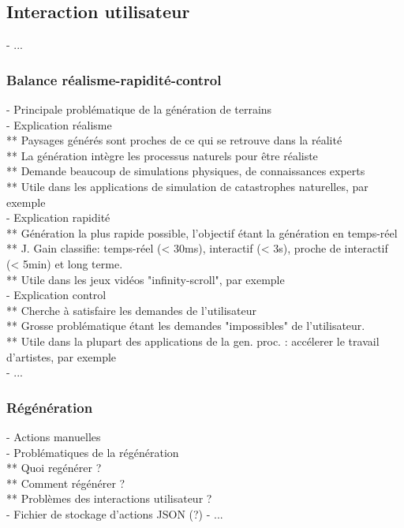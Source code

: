 \subsection{Interaction utilisateur}
- ...

\subsubsection{Balance réalisme-rapidité-control}
- Principale problématique de la génération de terrains \\
- Explication réalisme \\
** Paysages générés sont proches de ce qui se retrouve dans la réalité \\
** La génération intègre les processus naturels pour être réaliste \\
** Demande beaucoup de simulations physiques, de connaissances experts \\
** Utile dans les applications de simulation de catastrophes naturelles, par exemple \\
- Explication rapidité \\
** Génération la plus rapide possible, l'objectif étant la génération en temps-réel \\
** J. Gain classifie: temps-réel (< 30ms), interactif (< 3s), proche de interactif (< 5min) et long terme. \\
** Utile dans les jeux vidéos "infinity-scroll", par exemple\\
- Explication control \\
** Cherche à satisfaire les demandes de l'utilisateur \\
** Grosse problématique étant les demandes "impossibles" de l'utilisateur. \\
** Utile dans la plupart des applications de la gen. proc. : accélerer le travail d'artistes, par exemple \\
- ...

\subsubsection{Régénération}
- Actions manuelles \\
- Problématiques de la régénération \\
** Quoi regénérer ? \\
** Comment régénérer ? \\
** Problèmes des interactions utilisateur ? \\
- Fichier de stockage d'actions JSON (?)
- ...



